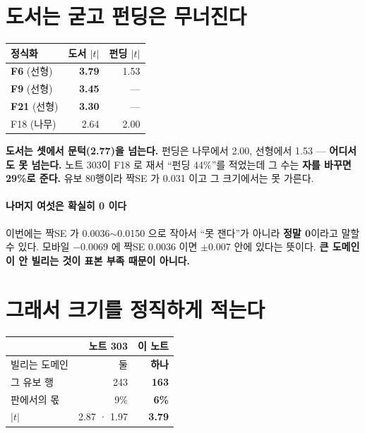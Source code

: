 \documentclass[10pt]{article}
\begin{document}
\section{도서는 굳고 펀딩은 무너진다}

\begin{center}\small
\begin{tabular}{lrr}
\hline
정식화 & 도서 $|t|$ & 펀딩 $|t|$ \\
\hline
\textbf{F6} (선형) & \textbf{3.79} & 1.53 \\
\textbf{F9} (선형) & \textbf{3.45} & --- \\
\textbf{F21} (선형) & \textbf{3.30} & --- \\
F18 (나무) & 2.64 & 2.00 \\
\hline
\end{tabular}
\end{center}

\textbf{도서는 셋에서 문턱(2.77)을 넘는다.} 펀딩은 나무에서 2.00, 선형에서
1.53 --- \textbf{어디서도 못 넘는다.} 노트 303이 F18 로 재서 ``펀딩 44\%''를
적었는데 그 수는 \textbf{자를 바꾸면 29\%로 준다.} 유보 80행이라 짝SE 가
0.031 이고 그 크기에서는 못 가른다.

\paragraph{나머지 여섯은 확실히 0 이다} 이번에는 짝SE 가 0.0036$\sim$0.0150
으로 작아서 ``못 잰다''가 아니라 \textbf{정말 0}이라고 말할 수 있다.
모바일 $-$0.0069 에 짝SE 0.0036 이면 $\pm$0.007 안에 있다는 뜻이다.
\textbf{큰 도메인이 안 빌리는 것이 표본 부족 때문이 아니다.}

\section{그래서 크기를 정직하게 적는다}

\begin{center}\small
\begin{tabular}{lrr}
\hline
& 노트 303 & \textbf{이 노트} \\
\hline
빌리는 도메인 & 둘 & \textbf{하나} \\
그 유보 행 & 243 & \textbf{163} \\
판에서의 몫 & 9\% & \textbf{6\%} \\
$|t|$ & 2.87 · 1.97 & \textbf{3.79} \\
\hline
\end{tabular}
\end{center}
\end{document}
